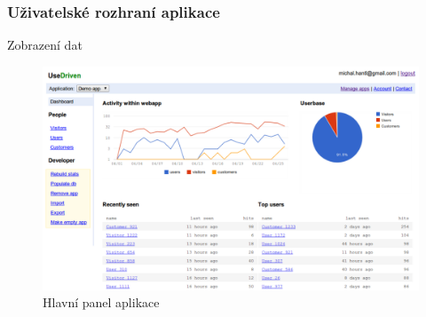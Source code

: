 \documentclass[bc,female,java,dept456]{diploma}						%
\begin{document}

\subsubsection{Uživatelské rozhraní aplikace}

Zobrazení dat

\begin{figure}[h]
	\centering
	\includegraphics[width=15cm]{img/ud_dashboard_2.pdf}
	\caption{Hlavní panel aplikace}
	\label{img:ud_dashboard}
\end{figure}
\end{document}
